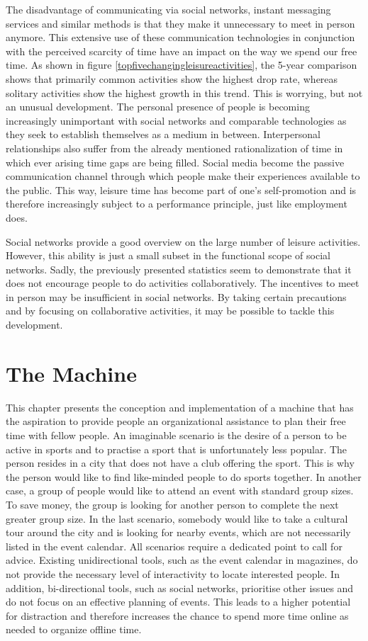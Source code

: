 \documentclass[12pt,numbers=noenddot,parskip,bibliography=totocnumbered,listof=totocnumbered,draft]{scrreprt}
\begin{document}
The disadvantage of communicating via social networks, instant messaging services and similar methods is that they make it unnecessary to meet in person anymore. This extensive use of these communication technologies in conjunction with the perceived scarcity of time have an impact on the way we spend our free time. As shown in figure \ref{topfivechangingleisureactivities}, the 5-year comparison shows that primarily common activities show the highest drop rate, whereas solitary activities show the highest growth in this trend. This is worrying, but not an unusual development. The personal presence of people is becoming increasingly unimportant with social networks and comparable technologies as they seek to establish themselves as a medium in between. Interpersonal relationships also suffer from the already mentioned rationalization of time in which ever arising time gaps are being filled. Social media become the passive communication channel through which people make their experiences available to the public. This way, leisure time has become part of one's self-promotion and is therefore increasingly subject to a performance principle, just like employment does.

Social networks provide a good overview on the large number of leisure activities. However, this ability is just a small subset in the functional scope of social networks. Sadly, the previously presented statistics seem to demonstrate that it does not encourage people to do activities collaboratively. The incentives to meet in person may be insufficient in social networks. By taking certain precautions and by focusing on collaborative activities, it may be possible to tackle this development.

\chapter{The Machine}
This chapter presents the conception and implementation of a machine that has the aspiration to provide people an organizational assistance to plan their free time with fellow people. An imaginable scenario is the desire of a person to be active in sports and to practise a sport that is unfortunately less popular. The person resides in a city that does not have a club offering the sport. This is why the person would like to find like-minded people to do sports together. In another case, a group of people would like to attend an event with standard group sizes. To save money, the group is looking for another person to complete the next greater group size. In the last scenario, somebody would like to take a cultural tour around the city and is looking for nearby events, which are not necessarily listed in the event calendar. All scenarios require a dedicated point to call for advice. Existing unidirectional tools, such as the event calendar in magazines, do not provide the necessary level of interactivity to locate interested people. In addition, bi-directional tools, such as social networks, prioritise other issues and do not focus on an effective planning of events. This leads to a higher potential for distraction and therefore increases the chance to spend more time online as needed to organize offline time.
\end{document}
